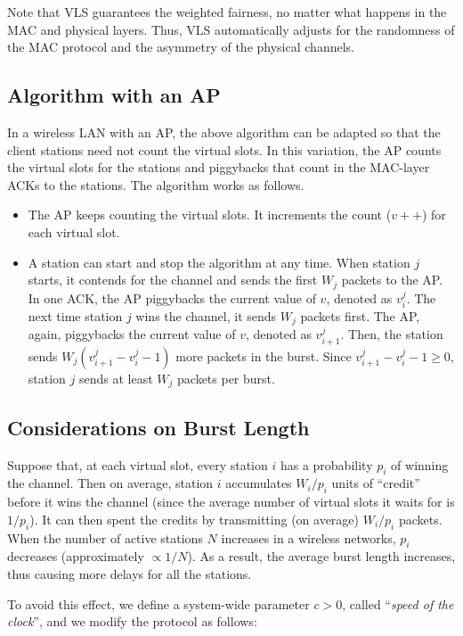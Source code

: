 \documentclass[letterpaper, 10 pt, conference]{ieeeconf}
\begin{document}
Note that VLS guarantees the weighted fairness, no matter what happens
in the MAC and physical layers. Thus, VLS automatically adjusts for
the randomness of the MAC protocol and the asymmetry of the physical channels.


\subsection{Algorithm with an AP}

In a wireless LAN with an AP, the above algorithm can be adapted so
that the client stations need not count the virtual slots. In this variation, 
the AP counts the virtual slots for the stations and piggybacks
that count in the MAC-layer ACKs to the stations. The algorithm
works as follows.

\begin{itemize}
\item The AP keeps counting the virtual slots. It increments the count ($v++$) for each virtual slot.
\item A station can start and stop the algorithm at any time. When station
$j$ starts, it contends for the channel and sends the first $W_{j}$
packets to the AP. In one ACK, the AP piggybacks the current value
of $v$, denoted as $v_{i}^{j}$. The next time station $j$ wins
the channel, it sends $W_{j}$ packets first. The AP, again, piggybacks
the current value of $v$, denoted as $v_{i+1}^{j}$. Then, the station
sends $W_{j}(v_{i+1}^{j}-v_{i}^{j}-1)$ more packets in the burst.
Since $v_{i+1}^{j}-v_{i}^{j}-1\ge0$, station $j$ sends at least
$W_{j}$ packets per burst.
\end{itemize}

\subsection{Considerations on Burst Length}

Suppose that, at each virtual slot, every station $i$ has a probability
$p_{i}$ of winning the channel. Then on average, station $i$ accumulates
$W_{i}/p_{i}$ units of {}``credit'' before it wins the channel
(since the average number of virtual slots it waits for is $1/p_{i}$).
It can then spent the credits by transmitting (on average) $W_{i}/p_{i}$
packets. When the number of active stations $N$ increases in a wireless
networks, $p_{i}$ decreases (approximately $\propto1/N$). As
a result, the average burst length increases, thus causing more
delays for all the stations.

To avoid this effect, we define a system-wide parameter $c>0$, called ``{\em speed of the clock}'',  and we modify the protocol as follows:
\end{document}
